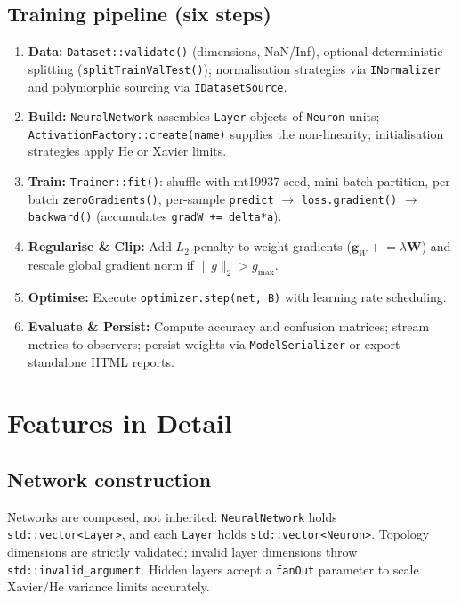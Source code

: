 \documentclass[11pt,a4paper]{article}
\begin{document}
\subsection{Training pipeline (six steps)}
\begin{enumerate}[itemsep=2pt]
    \item \textbf{Data:} \texttt{Dataset::validate()} (dimensions, NaN/Inf), optional deterministic splitting (\texttt{splitTrainValTest()}); normalisation strategies via \texttt{INormalizer} and polymorphic sourcing via \texttt{IDatasetSource}.
    \item \textbf{Build:} \texttt{NeuralNetwork} assembles \texttt{Layer} objects of \texttt{Neuron} units; \texttt{ActivationFactory::create(name)} supplies the non-linearity; initialisation strategies apply He or Xavier limits.
    \item \textbf{Train:} \texttt{Trainer::fit()}: shuffle with mt19937 seed, mini-batch partition, per-batch \texttt{zeroGradients()}, per-sample \texttt{predict} $\to$ \texttt{loss.gradient()} $\to$ \texttt{backward()} (accumulates \texttt{gradW += delta*a}).
    \item \textbf{Regularise \& Clip:} Add $L_2$ penalty to weight gradients ($\mathbf{g}_W \mathrel{+}= \lambda \mathbf{W}$) and rescale global gradient norm if $\|g\|_2 > g_{\max}$.
    \item \textbf{Optimise:} Execute \texttt{optimizer.step(net, B)} with learning rate scheduling.
    \item \textbf{Evaluate \& Persist:} Compute accuracy and confusion matrices; stream metrics to observers; persist weights via \texttt{ModelSerializer} or export standalone HTML reports.
\end{enumerate}

\section{Features in Detail}

\subsection{Network construction}
Networks are composed, not inherited: \texttt{NeuralNetwork} holds \texttt{std::vector<Layer>}, and each \texttt{Layer} holds \texttt{std::vector<Neuron>}. Topology dimensions are strictly validated; invalid layer dimensions throw \texttt{std::invalid\_argument}. Hidden layers accept a \texttt{fanOut} parameter to scale Xavier/He variance limits accurately.
\end{document}

